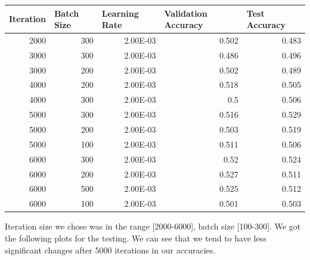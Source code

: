 \documentclass[
	12pt, %
]{fphw}
\begin{document}
\begin{table}[h!]
\begin{tabular}{|r|r|r|r|r|}
\hline
\multicolumn{1}{|l|}{\textbf{Iteration}} & \multicolumn{1}{l|}{\textbf{Batch Size}} & \multicolumn{1}{l|}{\textbf{Learning Rate}} & \multicolumn{1}{l|}{\textbf{Validation Accuracy}} & \multicolumn{1}{l|}{\textbf{Test Accuracy}} \\ \hline
2000 & 300 & 2.00E-03 & 0.502 & 0.483 \\ \hline
3000 & 300 & 2.00E-03 & 0.486 & 0.496 \\ \hline
3000 & 200 & 2.00E-03 & 0.502 & 0.489 \\ \hline
4000 & 200 & 2.00E-03 & 0.518 & 0.505 \\ \hline
4000 & 300 & 2.00E-03 & 0.5 & 0.506 \\ \hline
5000 & 300 & 2.00E-03 & 0.516 & 0.529 \\ \hline
5000 & 200 & 2.00E-03 & 0.503 & 0.519 \\ \hline
5000 & 100 & 2.00E-03 & 0.511 & 0.506 \\ \hline
6000 & 300 & 2.00E-03 & 0.52 & 0.524 \\ \hline
6000 & 200 & 2.00E-03 & 0.527 & 0.511 \\ \hline
6000 & 500 & 2.00E-03 & 0.525 & 0.512 \\ \hline
6000 & 100 & 2.00E-03 & 0.501 & 0.503 \\ \hline
\end{tabular}
\end{table}
Iteration size we chose was in the range [2000-6000], batch size [100-300].
We got the following plots for the testing. We can see that we tend to have less significant changes after 5000 iterations in our accuracies. 
\end{document}

